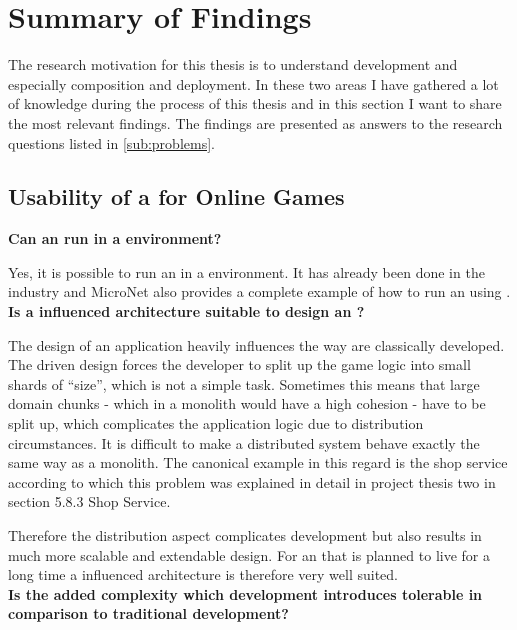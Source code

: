 \section{Summary of Findings}
\label{sub:summary_of_findings}

The research motivation for this thesis is to understand \ms{} development and
especially \ms{} composition and deployment. In these two areas I have gathered
a lot of knowledge during the process of this thesis and in this section I want
to share the most relevant findings. The findings are presented as
answers to the research questions listed in \autoref{sub:problems}.

\subsection{Usability of a \mss{} for Online Games}
\label{sub:usability_ms_og}

\noindent
\textbf{Can an \og{} run in a \ms{} environment?}

Yes, it is possible to run an \og{} in a \ms{} environment. It has already been
done in the industry \cite{pronschinske2015turbine} and MicroNet also
provides a complete example of how to run an \og{} using \mss{}.\\

\noindent
\textbf{Is a \ms{} influenced architecture suitable to design an \og{}?}

The design of an \og{} \ms{} application heavily influences the way \ogs{} are
classically developed. The \ms{} driven design forces the developer to split up
the game logic into small shards of \ms{} ``size'', which is not a simple task.
Sometimes this means that large domain chunks - which in a monolith would
have a high cohesion - have to be split up, which complicates the application
logic due to distribution circumstances. It is difficult to make a distributed system
behave exactly the same way as a monolith. The canonical example in this regard
is the shop service according to which this problem was explained in detail in
project thesis two \cite{biedermann2016project2} in section 5.8.3 Shop Service.

Therefore the distribution aspect complicates development but also results in
much more scalable and extendable design. For an \og{} that is planned to live
for a long time a \ms{} influenced architecture is therefore very well suited.\\

\newpage
\noindent \textbf{ Is the added complexity which \ms{} development
introduces tolerable in comparison to traditional \og{} development?}

